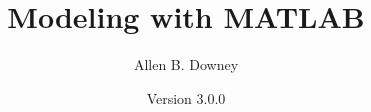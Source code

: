 




\usepackage{xcolor}

\usepackage{listings}
\iffalse
\lstset{
    language=matlab,
    basicstyle=\ttfamily,
    backgroundcolor=\color{bgcolor},
    commentstyle=\color{comment},
    keywordstyle=\color{keyword},
    stringstyle=\color{strings},
    columns=fullflexible,
    emph={label},  %
    keepspaces=true,
    showstringspaces=false,
    upquote=true,
    xleftmargin=0pt,  %
    framexleftmargin=3pt,
    aboveskip=\parskip,
    belowskip=\parskip
}
\fi
{}

\newcommand{\mcode}[1]{\lstinline{#1}}%

\usepackage{siunitx}

\usepackage{nshyper}
\renewcommand{\seename}{See}
\renewcommand{\alsoname}{See also}

\makeindex
\makeatletter
\def\idxdelim{\@ifnextchar{\hyperindexformat}{. }{, }}
\makeatother


\sloppy
\def\UrlFont{\em}

\frontmatter


\newcommand{\thetitle}{Modeling with MATLAB}
\newcommand{\theversion}{3.0.0}

\title {\thetitle}
\author {Allen B. Downey}
\date {Version \theversion}


\maketitle

